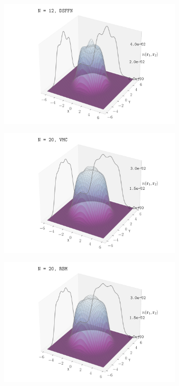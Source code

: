 \begin{figure}[H]
\begin{subfigure}[t]{0.32\textwidth}
        \includegraphics[width=\textwidth]{Chapters/Results/dots/density_profile_3d_N12_nqs_dsffn_1.0.pdf}
        \label{fig:sub6}
    \end{subfigure}
    \begin{subfigure}[t]{0.32\textwidth}
        \centering
        \includegraphics[width=\textwidth]{Chapters/Results/dots/density_profile_3d_N20_nqs_VMC_1.0.pdf}
    \end{subfigure}
    \begin{subfigure}[t]{0.32\textwidth}
        \centering
        \includegraphics[width=\textwidth]{Chapters/Results/dots/density_profile_3d_N20_nqs_RBM_1.0.pdf}

\end{subfigure}
\end{figure}
